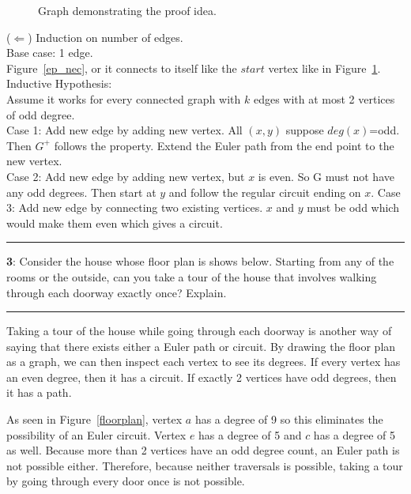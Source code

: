 \documentclass[11pt]{article}
\newcommand\question[2]{\vspace{.25in}\hrule\textbf{#1}: #2\vspace{.5em}\hrule\vspace{.10in}}
\begin{document}
\begin{figure}[ht]
	\centering
	\caption{Graph demonstrating the proof idea.}
	\label{numtwo}
\end{figure}

($\Longleftarrow$) Induction on number of edges.\\
Base case: 1 edge.\\
Figure~\ref{ep_nec}, or it connects to itself like the $start$ vertex like in Figure~\ref{numtwo}.\\
Inductive Hypothesis:\\
Assume it works for every connected graph with $k$ edges with at most 2 vertices of odd degree.\\
Case 1: Add new edge by adding new vertex. All $(x,y)$ suppose $deg(x)$=odd. Then $G^+$ follows the property. Extend the Euler path from the end point to the new vertex.\\
Case 2: Add new edge by adding new vertex, but $x$ is even. So G must not have any odd degrees. Then start at $y$ and follow the regular circuit ending on $x$.
Case 3: Add new edge by connecting two existing vertices. $x$ and $y$ must be odd which would make them even which gives a circuit.

\question{3}{Consider the house whose floor plan is shows below. Starting from any of the rooms or the outside, can you take a tour of the house that involves walking through each doorway exactly once? Explain.}

Taking a tour of the house while going through each doorway is another way of saying that there exists either a Euler path or circuit. By drawing the floor plan as a graph, we can then inspect each vertex to see its degrees. If every vertex has an even degree, then it has a circuit. If exactly 2 vertices have odd degrees, then it has a path. 

As seen in Figure~\ref{floorplan}, vertex $a$ has a degree of 9 so this eliminates the possibility of an Euler circuit. Vertex $e$ has a degree of 5 and $c$ has a degree of 5 as well. Because more than 2 vertices have an odd degree count, an Euler path is not possible either. Therefore, because neither traversals is possible, taking a tour by going through every door once is not possible.
\end{document}
